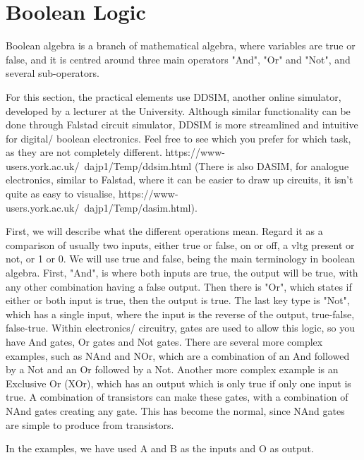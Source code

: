 \documentclass[a4paper,11pt]{report}
\begin{document}
\section{Boolean Logic}

Boolean algebra is a branch of mathematical algebra, where variables are true or false, and it is centred around three main operators "And", "Or" and "Not", and several sub-operators.

For this section, the practical elements use DDSIM, another online simulator, developed by a lecturer at the University. Although similar functionality can be done through Falstad circuit simulator, DDSIM is more streamlined and intuitive for digital/ boolean electronics. Feel free to see which you prefer for which task, as they are not completely different.
https://www-users.york.ac.uk/~dajp1/Temp/ddsim.html
(There is also DASIM, for analogue electronics, similar to Falstad, where it can be easier to draw up circuits, it isn't quite as easy to visualise, https://www-users.york.ac.uk/~dajp1/Temp/dasim.html).

First, we will describe what the different operations mean. Regard it as a comparison of usually two inputs, either true or false, on or off, a \gls{vltg} present or not, or 1 or 0. We will use true and false, being the main terminology in boolean algebra. First, "And", is where both inputs are true, the output will be true, with any other combination having a false output. Then there is "Or", which states if either or both input is true, then the output is true. The last key type is "Not", which has a single input, where the input is the reverse of the output, true-false, false-true. Within electronics/ circuitry, gates are used to allow this logic, so you have And gates, Or gates and Not gates. There are several more complex examples, such as NAnd and NOr, which are a combination of an And followed by a Not and an Or followed by a Not. Another more complex example is an Exclusive Or (XOr), which has an output which is only true if only one input is true. A combination of transistors can make these gates, with a combination of NAnd gates creating any gate. This has become the normal, since NAnd gates are simple to produce from transistors.

In the examples, we have used A and B as the inputs and O as output.
\end{document}
